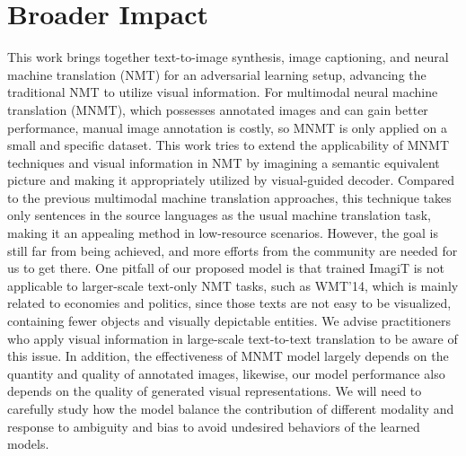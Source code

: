 \documentclass[11pt]{article}
\newcommand{\method}{ImagiT\xspace}
\begin{document}
\section{Broader Impact}
\label{sec:broader}
This work brings together text-to-image synthesis, image captioning, and neural machine translation (NMT) for an adversarial learning setup, advancing the traditional NMT to utilize visual information. For multimodal neural machine translation (MNMT), which possesses annotated images and can gain better performance, manual image annotation is costly, so MNMT is only applied on a small and specific dataset. This work tries to extend the applicability of MNMT techniques and visual information in NMT by imagining a semantic equivalent picture and making it appropriately utilized by visual-guided decoder. Compared to the previous multimodal machine translation approaches, this technique takes only sentences in the source languages as the usual machine translation task, making it an appealing method in low-resource scenarios. However, the goal is still far from being achieved, and more efforts from the community are needed for us to get there. One pitfall of our proposed model is that trained \method is not applicable to larger-scale text-only NMT tasks, such as WMT'14, which is mainly related to economies and politics, since those texts are not easy to be visualized, containing fewer objects and visually depictable entities. We advise practitioners who apply visual information in large-scale text-to-text translation to be aware of this issue. In addition, the effectiveness of MNMT model largely depends on the quantity and quality of annotated images, likewise, our model performance also depends on the quality of generated visual representations. We will need to carefully study how the model balance the contribution of different modality and response to ambiguity and bias to avoid undesired behaviors of the learned models. 
\end{document}
